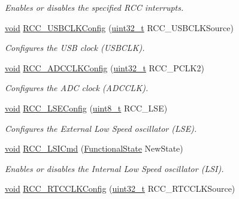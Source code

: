 \begin{DoxyCompactItemize}
\begin{DoxyCompactList}\small\item\em Enables or disables the specified R\+CC interrupts. \end{DoxyCompactList}\item 
\hyperlink{usb__devapi_8h_afabf60e7f57651d6d595a02c75f07cd0}{void} \hyperlink{group___r_c_c___private___functions_ga895b3ff3d143c990f1cd0146aa260081}{R\+C\+C\+\_\+\+U\+S\+B\+C\+L\+K\+Config} (\hyperlink{_p_e___types_8h_a33594304e786b158f3fb30289278f5af}{uint32\+\_\+t} R\+C\+C\+\_\+\+U\+S\+B\+C\+L\+K\+Source)
\begin{DoxyCompactList}\small\item\em Configures the U\+SB clock (U\+S\+B\+C\+LK). \end{DoxyCompactList}\item 
\hyperlink{usb__devapi_8h_afabf60e7f57651d6d595a02c75f07cd0}{void} \hyperlink{group___r_c_c___private___functions_gadda89cdb838bf49e5fa10f3f774530a4}{R\+C\+C\+\_\+\+A\+D\+C\+C\+L\+K\+Config} (\hyperlink{_p_e___types_8h_a33594304e786b158f3fb30289278f5af}{uint32\+\_\+t} R\+C\+C\+\_\+\+P\+C\+L\+K2)
\begin{DoxyCompactList}\small\item\em Configures the A\+DC clock (A\+D\+C\+C\+LK). \end{DoxyCompactList}\item 
\hyperlink{usb__devapi_8h_afabf60e7f57651d6d595a02c75f07cd0}{void} \hyperlink{group___r_c_c___private___functions_ga65209ab5c3589b249c7d70f978735ca6}{R\+C\+C\+\_\+\+L\+S\+E\+Config} (\hyperlink{_p_e___types_8h_aba7bc1797add20fe3efdf37ced1182c5}{uint8\+\_\+t} R\+C\+C\+\_\+\+L\+SE)
\begin{DoxyCompactList}\small\item\em Configures the External Low Speed oscillator (L\+SE). \end{DoxyCompactList}\item 
\hyperlink{usb__devapi_8h_afabf60e7f57651d6d595a02c75f07cd0}{void} \hyperlink{group___r_c_c___private___functions_ga81e3ca29fd154ac2019bba6936d6d5ed}{R\+C\+C\+\_\+\+L\+S\+I\+Cmd} (\hyperlink{agilefox_2library_2inc_2stm32f10x__type_8h_ac9a7e9a35d2513ec15c3b537aaa4fba1}{Functional\+State} New\+State)
\begin{DoxyCompactList}\small\item\em Enables or disables the Internal Low Speed oscillator (L\+SI). \end{DoxyCompactList}\item 
\hyperlink{usb__devapi_8h_afabf60e7f57651d6d595a02c75f07cd0}{void} \hyperlink{group___r_c_c___private___functions_ga1473d8a5a020642966359611c44181b0}{R\+C\+C\+\_\+\+R\+T\+C\+C\+L\+K\+Config} (\hyperlink{_p_e___types_8h_a33594304e786b158f3fb30289278f5af}{uint32\+\_\+t} R\+C\+C\+\_\+\+R\+T\+C\+C\+L\+K\+Source)

\end{DoxyCompactItemize}
